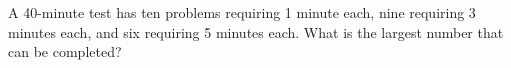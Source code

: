 A 40-minute test has ten problems requiring 1 minute each, nine requiring 3 minutes each, and six requiring 5 minutes each. What is the largest number that can be completed?
